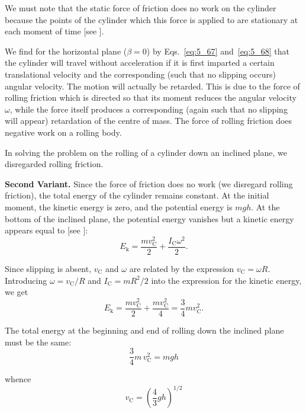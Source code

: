 We must note that the static force of friction does no work on the cylinder because the points of the cylinder which this force is applied to are stationary at each moment of time [see ].

We find for the horizontal plane ($\beta=0$) by Eqs.~\eqref{eq:5_67} and~\eqref{eq:5_68} that the cylinder will travel without acceleration if it is first imparted a certain translational velocity and the corresponding (such that no slipping occurs) angular velocity. The motion will actually be retarded. This is due to the force of rolling friction which is directed so that its moment reduces the angular velocity $\omega$, while the force itself produces a corresponding (again such that no slipping will appear) retardation of the centre of mass. The force of rolling friction does negative work on a rolling body.

In solving the problem on the rolling of a cylinder down an inclined plane, we disregarded rolling friction.

\textbf{Second Variant.} Since the force of friction does no work (we disregard rolling friction), the total energy of the cylinder remains constant. At the initial moment, the kinetic energy is zero, and the potential energy is $mgh$. At the bottom of the inclined plane, the potential energy vanishes but a kinetic energy appears equal to [see ]:
\begin{equation*}
	E_{\text{k}} = \frac{mv_{\text{C}}^2}{2} + \frac{I_{\text{C}}\omega^2}{2}.
\end{equation*}

Since slipping is absent, $v_{\text{C}}$ and $\omega$ are related by the expression $v_{\text{C}}=\omega R$. Introducing $\omega=v_{\text{C}}/R$ and $I_{\text{C}}=mR^2/2$ into the expression for the kinetic energy, we get
\begin{equation*}
	E_{\text{k}} = \frac{mv_{\text{C}}^2}{2} + \frac{mv_{\text{C}}^2}{4} = \frac{3}{4}mv_{\text{C}}^2.
\end{equation*}

The total energy at the beginning and end of rolling down the inclined plane must be the same:
\begin{equation*}
	\frac{3}{4}m\,v_{\text{C}}^2 = mgh
\end{equation*}

\noindent
whence
\begin{equation*}
	v_{\text{C}} = \left(\frac{4}{3}gh\right)^{1/2}
\end{equation*}


